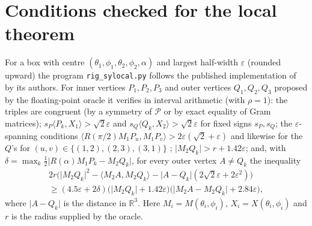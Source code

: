 \documentclass[11pt]{amsart}
\theoremstyle{definition}
\newcommand{\R}{\mathbb{R}}
\newcommand{\ip}[2]{\langle #1,#2\rangle}
\newcommand{\abs}[1]{\lvert #1\rvert}
\newcommand{\RID}{\mathcal{P}}
\begin{document}
\section{Conditions checked for the local theorem}\label{app:sylocal}
For a box with centre $(\theta_1,\phi_1,\theta_2,\phi_2,\alpha)$ and largest half-width $\varepsilon$ (rounded upward) the program
\texttt{rig\_sylocal.py} follows the published implementation of \cite[Theorem 36]{SY25} by its authors. For inner
vertices $P_1,P_2,P_3$ and outer vertices $Q_1,Q_2,Q_3$ proposed by the floating-point oracle it verifies in interval
arithmetic (with $\rho=1$): the triples are congruent (by a symmetry of $\RID$ or by exact equality of Gram matrices);
$s_P\ip{P_k}{X_1}>\sqrt2\varepsilon$ and $s_Q\ip{Q_k}{X_2}>\sqrt2\varepsilon$ for fixed signs $s_P,s_Q$; the
$\varepsilon$-spanning conditions $\ip{R(\pi/2)M_1P_u}{M_1P_v}>2\varepsilon(\sqrt2+\varepsilon)$ and likewise for the $Q$'s
for $(u,v)\in\{(1,2),(2,3),(3,1)\}$ \cite[Definition 27]{SY25}; $\abs{M_2Q_k}>r+1.42\varepsilon$; and, with
$\delta=\max_k\tfrac12\abs{R(\alpha)M_1P_k-M_2Q_k}$, for every outer vertex $A\ne Q_k$ the inequality
\begin{multline*}
2r\bigl(\abs{M_2Q_k}^2-\ip{M_2A}{M_2Q_k}-\abs{A-Q_k}(2\sqrt2\varepsilon+2\varepsilon^2)\bigr)\\
\ge(4.5\varepsilon+2\delta)\bigl(\abs{M_2Q_k}+1.42\varepsilon\bigr)\bigl(\abs{M_2A-M_2Q_k}+2.84\varepsilon\bigr),
\end{multline*}
where $\abs{A-Q_k}$ is the distance in $\R^3$. Here
$M_i=M(\theta_i,\phi_i)$, $X_i=X(\theta_i,\phi_i)$ and $r$ is the radius supplied by the oracle.
\end{document}
